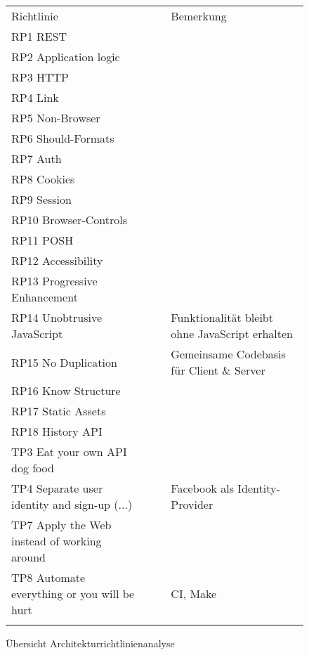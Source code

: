 \begin{figure}[H]
	\begin{table}[H]
		\tablestyle
		\tablealtcolored
		\begin{tabularx}{\textwidth}{l c c X}
			\tableheadcolor
				\tablehead Richtlinie &
				\tablehead\rotatebox{90}{Demonstriert\hspace{3mm}} &
				\tablehead\rotatebox{90}{Resultat} &
				\tablehead Bemerkung
				\tabularnewline
			\tablebody
				RP1	REST & \faOk & \faThumbsUp & \tabularnewline
				RP2 Application logic & & & \tabularnewline
				RP3 HTTP & \faOk & \faThumbsUp & \tabularnewline
				RP4 Link & \faOk & \faThumbsUp & \tabularnewline
				RP5 Non-Browser & \faOk & \faThumbsUp & \tabularnewline
				RP6 Should-Formats & & & \tabularnewline
				RP7 Auth & & & \tabularnewline
				RP8 Cookies & & & \tabularnewline
				RP9 Session & & & \tabularnewline
				RP10 Browser-Controls & & & \tabularnewline
				RP11 POSH & & & \tabularnewline
				RP12 Accessibility & & & \tabularnewline
				RP13 Progressive Enhancement & & & \tabularnewline
				RP14 Unobtrusive JavaScript & \faOk & \faThumbsUp & Funktionalität bleibt ohne JavaScript erhalten\tabularnewline
				RP15 No Duplication & & & Gemeinsame Codebasis für Client \& Server\tabularnewline
				RP16 Know Structure & & & \tabularnewline
				RP17 Static Assets & \faOk & \faThumbsUp & \tabularnewline
				RP18 History API & \faOk & \faThumbsUp & \tabularnewline
				TP3 Eat your own API dog food & & & \tabularnewline
				TP4 Separate user identity and sign-up (...) & \faOk & \faThumbsUp & Facebook als Identity-Provider\tabularnewline
				TP7 Apply the Web instead of working around & & & \tabularnewline
				TP8 Automate everything or you will be hurt & \faOk & \faThumbsUp & \gls{CI}, Make\tabularnewline
			\tableend
		\end{tabularx}
	\end{table}
	\caption{Übersicht Architekturrichtlinienanalyse}
	\label{fig:overview-principle-demonstration}
\end{figure}



\newpage

